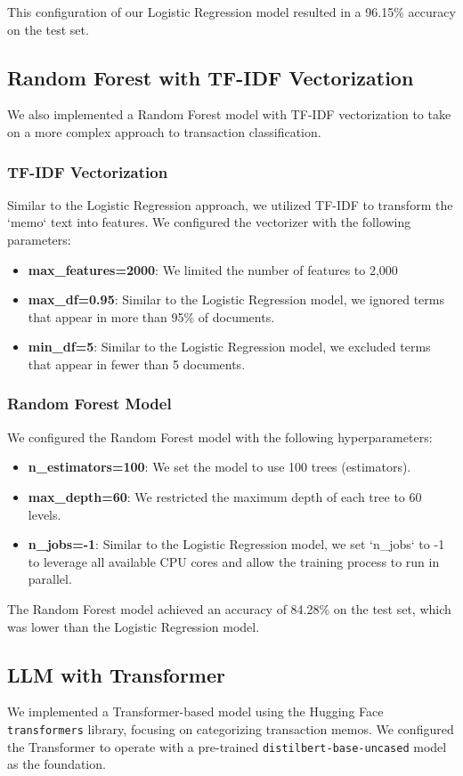 \documentclass[12pt,letterpaper]{article}
\begin{document}
This configuration of our Logistic Regression model resulted in a 96.15\% accuracy on the test set.

\subsection{Random Forest with TF-IDF Vectorization}
We also implemented a Random Forest model with TF-IDF vectorization to take on a more complex approach to transaction classification.

\subsubsection{TF-IDF Vectorization}
Similar to the Logistic Regression approach, we utilized TF-IDF to transform the `memo` text into features. We configured the vectorizer with the following parameters:
\begin{itemize}
    \item \textbf{max\_features=2000}: We limited the number of features to 2,000
    \item \textbf{max\_df=0.95}: Similar to the Logistic Regression model, we ignored terms that appear in more than 95\% of documents.
    \item \textbf{min\_df=5}: Similar to the Logistic Regression model, we excluded terms that appear in fewer than 5 documents.
\end{itemize}

\subsubsection{Random Forest Model}
We configured the Random Forest model with the following hyperparameters:
\begin{itemize}
    \item \textbf{n\_estimators=100}: We set the model to use 100 trees (estimators).
    \item \textbf{max\_depth=60}: We restricted the maximum depth of each tree to 60 levels.
    \item \textbf{n\_jobs=-1}: Similar to the Logistic Regression model, we set `n\_jobs` to -1 to leverage all available CPU cores and allow the training process to run in parallel.
\end{itemize}

The Random Forest model achieved an accuracy of 84.28\% on the test set, which was lower than the Logistic Regression model.

\subsection{LLM with Transformer}
We implemented a Transformer-based model using the Hugging Face \texttt{transformers} library, focusing on categorizing transaction memos. We configured the Transformer to operate with a pre-trained \texttt{distilbert-base-uncased} model as the foundation.
\end{document}
